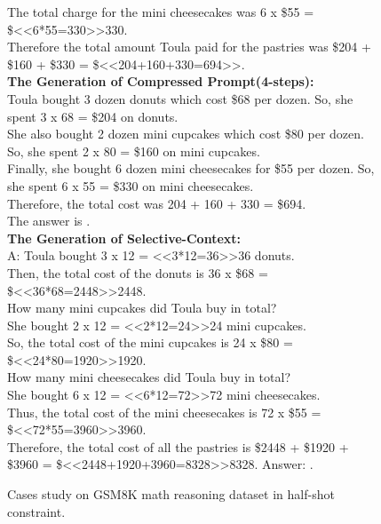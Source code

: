 \begin{figure*}[htb]
\begin{tcolorbox}
    The total charge for the mini cheesecakes was 6 x \$55 = \$<<6*55=330>>330.\\
    Therefore the total amount Toula paid for the pastries was \$204 + \$160 + \$330 = \$<<204+160+330=694>>.\\
    \textbf{The Generation of Compressed Prompt(4-steps):}\\
    Toula bought 3 dozen donuts which cost \$68 per dozen. So, she spent 3 x 68 = \$204 on donuts.\\
    She also bought 2 dozen mini cupcakes which cost \$80 per dozen. So, she spent 2 x 80 = \$160 on mini cupcakes.\\
    Finally, she bought 6 dozen mini cheesecakes for \$55 per dozen. So, she spent 6 x 55 = \$330 on mini cheesecakes.\\
    Therefore, the total cost was 204 + 160 + 330 = \$694.\\
    The answer is .\\
    \textbf{The Generation of Selective-Context:}\\
    A: Toula bought 3 x 12 = <<3*12=36>>36 donuts.\\
    Then, the total cost of the donuts is 36 x \$68 = \$<<36*68=2448>>2448.\\
    How many mini cupcakes did Toula buy in total?\\
    She bought 2 x 12 = <<2*12=24>>24 mini cupcakes.\\
    So, the total cost of the mini cupcakes is 24 x \$80 = \$<<24*80=1920>>1920.\\
    How many mini cheesecakes did Toula buy in total?\\
    She bought 6 x 12 = <<6*12=72>>72 mini cheesecakes.\\
    Thus, the total cost of the mini cheesecakes is 72 x \$55 = \$<<72*55=3960>>3960.\\
    Therefore, the total cost of all the pastries is \$2448 + \$1920 + \$3960 = \$<<2448+1920+3960=8328>>8328. Answer: .
    \end{tcolorbox}
    \caption{Cases study on GSM8K math reasoning dataset in half-shot constraint.}
    \label{fig:case_gsm8k}
\end{figure*}


